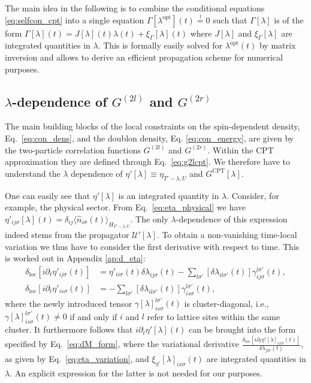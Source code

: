 \documentclass[twocolumn,prb,showpacs,aps,superscriptaddress]{revtex4}
\newcommand{\est}[1]{\ensuremath{\langle {#1} \rangle}}
\newcommand{\deltaloc}[0]{\ensuremath{\delta_\mathrm{loc}}}
\begin{document}
The main idea in the following is to combine the conditional equations
\eqref{eq:selfcon_cpt} into a single equation $\Gamma[\lambda^\text{opt}](t)
\stackrel{!}{=} 0$ such that $\Gamma[\lambda]$ is of the form
$\Gamma[\lambda](t) = J[\lambda](t) \lambda(t) + \xi_\Gamma[\lambda](t)$ where 
$J[\lambda]$ and $\xi_\Gamma[\lambda]$ are integrated quantities in $\lambda$.
This is formally easily solved for $\lambda^\text{opt}(t)$ by matrix inversion
and allows to derive an efficient propagation scheme for numerical purposes.

\subsection{$\lambda$-dependence of $G^{(2l)}$ and $G^{(2r)}$}
\label{sec:c}

The main building blocks of the local constraints on the spin-dependent
density, Eq.\  \eqref{eq:con_dens}, and the doublon density, Eq.
\eqref{eq:con_energy}, are given by the two-particle correlation functions
$G^{(2l)}$ and $G^{(2r)}$. Within the CPT approximation they are defined
through Eq.\  \eqref{eq:g2lcpt}. We therefore have to understand the $\lambda$
dependence of $\eta'[\lambda]\equiv \eta_{T' - \lambda, U}$ and
$G^\text{CPT}[\lambda]$.

One can easily see that $\eta'[\lambda]$ is an integrated quantity in
$\lambda$.  Consider, for example, the physical sector.  From Eq.\
\eqref{eq:eta_physical} we have $\eta'_{ij\sigma}[\lambda](t) =
\delta_{ij}\est{\hat{n}_{i\bar\sigma}(t)}_{H_{T' - \lambda, U}}$. The only
$\lambda$-dependence of this expression indeed stems from the propagator
$\mathcal{U}'[\lambda]$. To obtain a non-vanishing time-local variation we thus
have to consider the first derivative with respect to time.  This is worked out
in Appendix \ref{ap:d_eta}:
\begin{align}
  \deltaloc[i\partial_t \eta'_{ij\sigma}(t)]
  &
  =
  \eta'_{ii\sigma}(t)\delta\lambda_{ij\sigma}(t)
  -
  \sum_{l\sigma'}
  [\delta\lambda_{il\sigma'}(t)]\gamma^{l\sigma'}_{ij\sigma}(t),
  \nonumber \\
  \deltaloc[i\partial_t \eta'_{is\sigma}(t)]
  &
  =
  -\sum_{l\sigma'}
  [\delta \lambda_{il\sigma'}(t)]\gamma^{l\sigma'}_{is\sigma}(t),
  \label{eq:eta_variation}
\end{align}
where the newly introduced tensor $\gamma[\lambda]^{l\sigma'}_{is\sigma}(t)$ is
cluster-diagonal, i.e., $\gamma[\lambda]^{l\sigma'}_{is\sigma}(t) \neq 0$ if
and only if $i$ and $l$ refer to lattice sites within the same cluster.  It
furthermore follows that $i\partial_t \eta'[\lambda](t)$ can be brought into
the form specified by Eq.\ \eqref{eq:dM_form}, where the variational derivative
$\frac{\deltaloc [i\partial_t \eta'[\lambda]_{ix\sigma}(t)]}
{\delta\lambda_{jl\sigma}(t)}$, as given by Eq.\ \eqref{eq:eta_variation}, and
$\xi_{\eta'}[\lambda]_{ix\sigma}(t)$ are integrated quantities in $\lambda$.
An explicit expression for the latter is not needed for our purposes.
\end{document}
